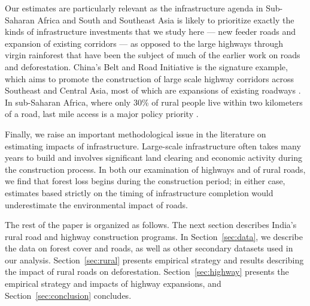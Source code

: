 Our estimates are particularly relevant as the infrastructure agenda
in Sub-Saharan Africa and South and Southeast Asia is likely to
prioritize exactly the kinds of infrastructure investments that we
study here --- new feeder roads and expansion of existing corridors
--- as opposed to the large highways through virgin rainforest that
have been the subject of much of the earlier work on roads and
deforestation. China's Belt and Road Initiative is the signature
example, which aims to promote the construction of large scale highway
corridors across Southeast and Central Asia, most of which are
expansions of existing roadways \cite{HT18}. In sub-Saharan Africa,
where only 30\% of rural people live within two kilometers of a road, last mile
access is a major policy priority \cite{WB06}.

Finally, we raise an important methodological issue in the literature
on estimating impacts of infrastructure. Large-scale infrastructure
often takes many years to build and involves significant land clearing
and economic activity during the construction process. In both our
examination of highways and of rural roads, we find that forest loss
begins during the construction period; in either case, estimates based
strictly on the timing of infrastructure completion would
underestimate the environmental impact of roads.

The rest of the paper is organized as follows. The next
section describes India's rural road and highway construction
programs. In Section~\ref{sec:data}, we describe the data on
forest cover and roads, as well as other secondary datasets used in
our analysis. Section~\ref{sec:rural} presents empirical strategy
and results describing the impact of rural roads on deforestation. 
Section~\ref{sec:highway} presents the empirical strategy and impacts
of highway expansions, and Section~\ref{sec:conclusion} concludes.

